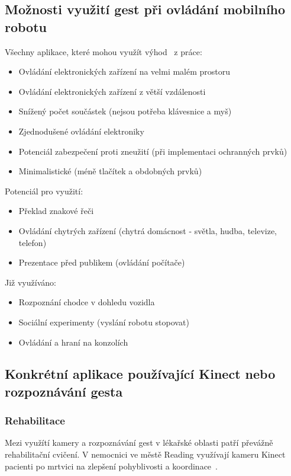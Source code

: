 \subsection{Možnosti využití gest při ovládání mobilního robotu}
Všechny aplikace, které mohou využít výhod~\cite{14} z práce:
\begin{itemize}
\item Ovládání elektronických zařízení na velmi malém prostoru
\item Ovládání elektronických zařízení z větší vzdálenosti
\item Snížený počet součástek (nejsou potřeba klávesnice a myš)
\item Zjednodušené ovládání elektroniky
\item Potenciál zabezpečení proti zneužití (při implementaci ochranných prvků)
\item Minimalistické (méně tlačítek a obdobných prvků)\\
\end{itemize}
Potenciál pro využití:
\begin{itemize}
\item Překlad znakové řeči
\item Ovládání chytrých zařízení (chytrá domácnost - světla, hudba, televize, telefon)
\item Prezentace před publikem (ovládání počítače)
\\
\end{itemize}
Již využíváno:
\begin{itemize}
\item Rozpoznání chodce v dohledu vozidla
\item Sociální experimenty (vyslání robotu stopovat)
\item Ovládání a hraní na konzolích
\end{itemize}

\subsection{Konkrétní aplikace používající Kinect nebo rozpoznávání gesta}
\subsubsection{Rehabilitace}
Mezi využítí kamery a rozpoznávání gest v lékařské oblasti patří převážně rehabilitační cvičení. V nemocnici ve městě Reading využívají kameru Kinect pacienti po mrtvici na zlepšení pohyblivosti a koordinace~\cite{21}. 

